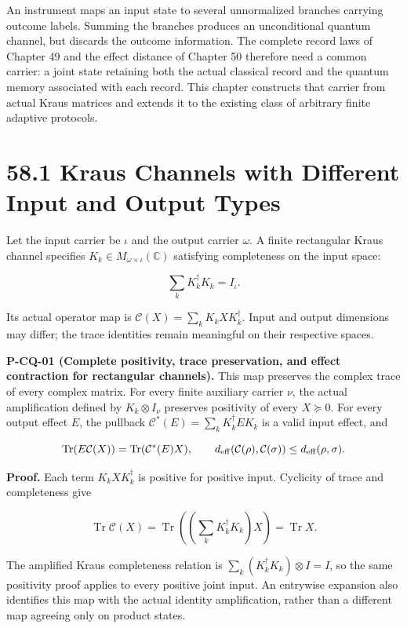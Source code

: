 \documentclass[
  11pt,
  oneside]{book}
\begin{document}
An instrument maps an input state to several unnormalized branches
carrying outcome labels. Summing the branches produces an unconditional
quantum channel, but discards the outcome information. The complete
record laws of Chapter 49 and the effect distance of Chapter 50
therefore need a common carrier: a joint state retaining both the actual
classical record and the quantum memory associated with each record.
This chapter constructs that carrier from actual Kraus matrices and
extends it to the existing class of arbitrary finite adaptive protocols.

\section{58.1 Kraus Channels with Different Input and Output Types}

Let the input carrier be \(\iota\) and the output carrier \(\omega\). A
finite rectangular Kraus channel specifies
\(K_k\in M_{\omega\times\iota}(\mathbb C)\) satisfying completeness on
the input space:

\[
\sum_kK_k^\dagger K_k=I_\iota.
\]

Its actual operator map is \(\mathcal C(X)=\sum_kK_kXK_k^\dagger\).
Input and output dimensions may differ; the trace identities remain
meaningful on their respective spaces.

\label{p-cq-01}{}

\textbf{P-CQ-01 (Complete positivity, trace preservation, and effect
contraction for rectangular channels).} This map preserves the complex
trace of every complex matrix. For every finite auxiliary carrier
\(\nu\), the actual amplification defined by \(K_k\otimes I_\nu\)
preserves positivity of every \(X\succeq0\). For every output effect
\(E\), the pullback \(\mathcal C^*(E)=\sum_kK_k^\dagger E K_k\) is a
valid input effect, and

\[
\operatorname{Tr}(E\mathcal C(X))=\operatorname{Tr}(\mathcal C^*(E)X),\qquad
d_{\rm eff}(\mathcal C(\rho),\mathcal C(\sigma))\le d_{\rm eff}(\rho,\sigma).
\]

\textbf{Proof.} Each term \(K_kXK_k^\dagger\) is positive for positive
input. Cyclicity of trace and completeness give

\[
\operatorname{Tr}\mathcal C(X)
=\operatorname{Tr}\!\left(\left(\sum_kK_k^\dagger K_k\right)X\right)
=\operatorname{Tr}X.
\]

The amplified Kraus completeness relation is
\(\sum_k(K_k^\dagger K_k)\otimes I=I\), so the same positivity proof
applies to every positive joint input. An entrywise expansion also
identifies this map with the actual identity amplification, rather than
a different map agreeing only on product states.
\end{document}
